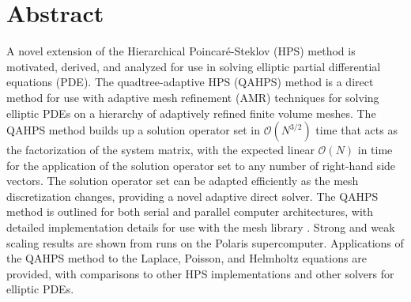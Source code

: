 \chapter*{Abstract}

A novel extension of the Hierarchical Poincar\'e-Steklov (HPS) method \citep{gillman2014direct} is motivated, derived, and analyzed for use in solving elliptic partial differential equations (PDE). The quadtree-adaptive HPS (QAHPS) method is a direct method for use with adaptive mesh refinement (AMR) techniques for solving elliptic PDEs on a hierarchy of adaptively refined finite volume meshes. The QAHPS method builds up a solution operator set in $\mathcal{O}(N^{3/2})$ time that acts as the factorization of the system matrix, with the expected linear $\mathcal{O}(N)$ in time for the application of the solution operator set to any number of right-hand side vectors. The solution operator set can be adapted efficiently as the mesh discretization changes, providing a novel adaptive direct solver. The QAHPS method is outlined for both serial and parallel computer architectures, with detailed implementation details for use with the mesh library \pforest \citep{burstedde2011p4est}. Strong and weak scaling results are shown from runs on the Polaris supercomputer. Applications of the QAHPS method to the Laplace, Poisson, and Helmholtz equations are provided, with comparisons to other HPS implementations and other solvers for elliptic PDEs.